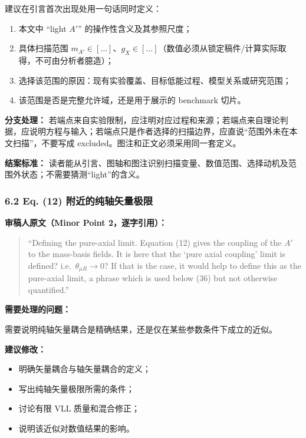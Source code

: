 \documentclass[
]{article}
\providecommand{\tightlist}{%
  \setlength{\itemsep}{0pt}\setlength{\parskip}{0pt}}
\begin{document}
建议在引言首次出现处用一句话同时定义：

\begin{enumerate}
\def\labelenumi{\arabic{enumi}.}
\tightlist
\item
  本文中 ``light \(A'\)'' 的操作性含义及其参照尺度；
\item
  具体扫描范围
  \(m_{A'}\in[\ldots]\)、\(g_X\in[\ldots]\)（数值必须从锁定稿件/计算实际取得，不可由分析者臆造）；
\item
  选择该范围的原因：现有实验覆盖、目标低能过程、模型关系或研究范围；
\item
  该范围是否是完整允许域，还是用于展示的 benchmark 切片。
\end{enumerate}

\textbf{分支处理：}
若端点来自实验限制，应注明对应过程和来源；若端点来自理论判据，应说明方程与输入；若端点只是作者选择的扫描边界，应直说``范围外未在本文扫描''，不要写成
excluded。图注和正文必须采用同一套定义。

\textbf{结案标准：}
读者能从引言、图轴和图注识别扫描变量、数值范围、选择动机及范围外状态；不需要猜测``light''的含义。

\subsubsection{6.2 Eq. (12)
附近的纯轴矢量极限}\label{eq.-12-ux9644ux8fd1ux7684ux7eafux8f74ux77e2ux91cfux6781ux9650}

\textbf{审稿人原文（Minor Point 2，逐字引用）：}

\begin{quote}
``Defining the pure-axial limit. Equation (12) gives the coupling of the
\(A'\) to the mass-basis fields. It is here that the `pure axial
coupling' limit is defined? i.e.~\(\theta_{\mu R}\to0\)? If that is the
case, it would help to define this as the pure-axial limit, a phrase
which is used below (36) but not otherwise quantified.''
\end{quote}

\textbf{需要处理的问题：}

需要说明纯轴矢量耦合是精确结果，还是仅在某些参数条件下成立的近似。

\textbf{建议修改：}

\begin{itemize}
\tightlist
\item
  明确矢量耦合与轴矢量耦合的定义；
\item
  写出纯轴矢量极限所需的条件；
\item
  讨论有限 VLL 质量和混合修正；
\item
  说明该近似对数值结果的影响。
\end{itemize}
\end{document}
